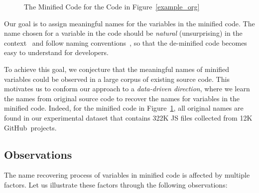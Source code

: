 \begin{figure}[t]
\begin{center}

\caption{The Minified Code for the Code in Figure~\ref{example_org}}
\label{example_sim}
\end{center}
\end{figure}



Our goal is to assign meaningful names for the variables in the
minified code.
%
The name chosen for a variable in the code should be {\em natural}
(unsurprising) in the context~\cite{JSNaughty2017} and follow naming
conventions~\cite{barr-codeconvention-fse14}, so that the de-minified
code becomes easy to understand for developers.


To achieve this goal, we conjecture that the meaningful names of
minified variables could be observed in a large corpus of existing
source code. This motivates us to conform our approach to a {\em
  data-driven direction}, where we learn the names from original source
code to recover the names for variables in the minified code.
%
Indeed, for the minified code in Figure~\ref{example_sim}, all
original names are found in our experimental dataset that contains
322K JS files collected from 12K GitHub~projects.
%

\subsection{Observations}

The name recovering process of variables in
minified code is affected by multiple factors. Let us illustrate these
factors through the following observations:

